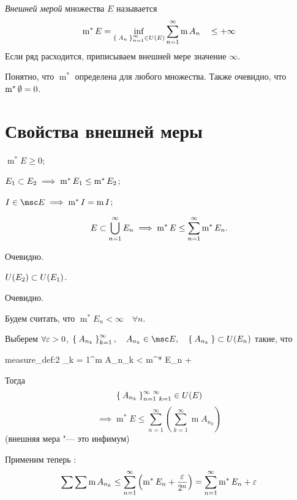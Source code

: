 \begin{definition}
	\emph{Внешней мерой} множества $ E $ называется
	$$ \operatorname m^* E = \inf\limits_{\Set{A_n}_{n = 1}^\infty \in U(E)} \sum_{n = 1}^\infty \operatorname m A_n \quad \le +\infty $$
	Если ряд расходится, приписываем внешней мере значение $ \infty $.
\end{definition}

Понятно, что $ \operatorname m^* $ определена для любого множества. Также очевидно, что $ \operatorname m^* \emptyset = 0 $.

\section{Свойства внешней меры}

\begin{props}
	\item $ \operatorname m^* E \ge 0 $;
	\item $ E_1 \subset E_2 \implies \operatorname m^* E_1 \le \operatorname m^* E_2 $;
	\item $ I \in \msc E \implies \operatorname m^* I = \operatorname m I $;
	\item \label{en:outer_meas:4}
	$$ E \subset \bigcup_{n = 1}^\infty E_n \implies \operatorname m^* E \le \sum_{n = 1}^\infty \operatorname m^* E_n. $$
\end{props}

\begin{eproof}
	\item Очевидно.
	\item $ U(E_2) \subset U(E_1) $.
	\item Очевидно.
	\item Будем считать, что $ \operatorname m^* E_n < \infty \quad \forall n $.

	Выберем $ \forall \varepsilon > 0 $, $ \set{A_{n_k}}_{k = 1}^\infty, \quad A_{n_k} \in \msc E, \quad \set{A_{n_k}} \sub U(E_n) $ такие, что
	\begin{equ}{measure_def:2}
		\sum_{k = 1}^\infty \operatorname m A_{n_k} < \operatorname m^* E_n + \frac{}
	\end{equ}
	Тогда
	$$ \Set{A_{n_k}}_{n = 1~k = 1}^{\infty~\infty} \in U(E) $$
	$$ \implies \operatorname m^* E \le \sum_{n = 1}^\infty \left( \sum_{k = 1}^\infty \operatorname mA_{n_k} \right) $$
	(\as внешняя мера "--- это инфимум)

	Применим теперь :
	$$ \sum \sum \operatorname m A_{n_k} \le \sum_{n = 1}^\infty \left( \operatorname m^* E_n + \frac{\varepsilon}{2^n} \right) = \sum_{n = 1}^\infty \operatorname m^* E_n + \varepsilon $$
\end{eproof}

